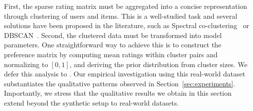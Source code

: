 First, the sparse rating matrix must be aggregated into a concise representation through clustering of users and items. This is a well-studied task and several solutions have been proposed in the literature, such as Spectral co-clustering~\cite{coclustering} or DBSCAN~\cite{dbscan}. Second, the clustered data must be transformed into model parameters. One straightforward way to achieve this is to construct the preference matrix by computing mean ratings within cluster pairs and normalizing to $[0,1]$, and deriving the prior distribution from cluster sizes. We defer this analysis to . Our empirical investigation using this real-world dataset substantiates the qualitative patterns observed in Section~\ref{sec:experiments}. Importantly, we stress that the qualitative results we obtain in this section extend beyond the synthetic setup to real-world datasets.


